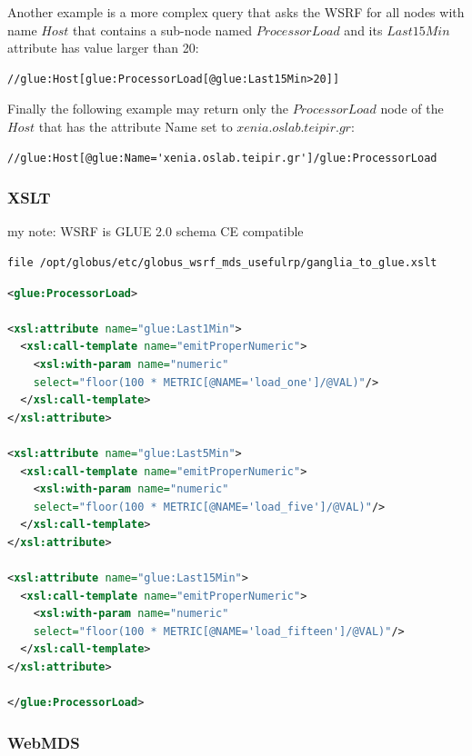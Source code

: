 Another example is a more complex query that asks the WSRF for all nodes with name $Host$ that contains a sub-node named $ProcessorLoad$ and its $Last15Min$ attribute has value larger than 20:
\begin{verbatim}
//glue:Host[glue:ProcessorLoad[@glue:Last15Min>20]]
\end{verbatim}

Finally the following example may return only the $ProcessorLoad$ node of the $Host$ that has the attribute Name set to $xenia.oslab.teipir.gr$:
\begin{verbatim}
//glue:Host[@glue:Name='xenia.oslab.teipir.gr']/glue:ProcessorLoad
\end{verbatim}


\subsubsection{XSLT}

my note: WSRF is GLUE 2.0 schema CE compatible

\begin{verbatim}
file /opt/globus/etc/globus_wsrf_mds_usefulrp/ganglia_to_glue.xslt
\end{verbatim}

\begin{lstlisting}[language=XML,caption=WSRF XSLT for Ganglia Information Provider]
<glue:ProcessorLoad>

<xsl:attribute name="glue:Last1Min">
  <xsl:call-template name="emitProperNumeric">
    <xsl:with-param name="numeric" 
    select="floor(100 * METRIC[@NAME='load_one']/@VAL)"/>
  </xsl:call-template>
</xsl:attribute>

<xsl:attribute name="glue:Last5Min">
  <xsl:call-template name="emitProperNumeric">
    <xsl:with-param name="numeric" 
    select="floor(100 * METRIC[@NAME='load_five']/@VAL)"/>
  </xsl:call-template>
</xsl:attribute>

<xsl:attribute name="glue:Last15Min">
  <xsl:call-template name="emitProperNumeric">
    <xsl:with-param name="numeric" 
    select="floor(100 * METRIC[@NAME='load_fifteen']/@VAL)"/>
  </xsl:call-template>
</xsl:attribute>

</glue:ProcessorLoad>
\end{lstlisting}

\subsubsection{WebMDS}

